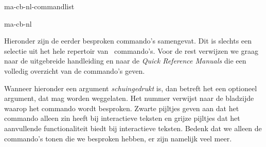 \startonderdeel ma-cb-nl-commandlist

\produkt ma-cb-nl

Hieronder zijn de eerder besproken commando's samengevat.
Dit is slechts een selectie uit het hele repertoir van
\CONTEXT\ commando's. Voor de rest verwijzen we graag naar
de uitgebreide handleiding en naar de {\em Quick Reference
Manuals} die een volledig overzicht van de commando's geven.

Wanneer hieronder een argument {\sl schuingedrukt} is, dan
betreft het een optioneel argument, dat mag worden
weggelaten. Het nummer verwijst naar de bladzijde waarop het
commando wordt besproken. Zwarte pijltjes geven aan dat het
commando alleen zin heeft bij interactieve teksten en grijze
pijltjes dat het aanvullende functionaliteit biedt bij
interactieve teksten. Bedenk dat we alleen de commando's
tonen die we besproken hebben, er zijn namelijk veel meer.

\stoponderdeel
